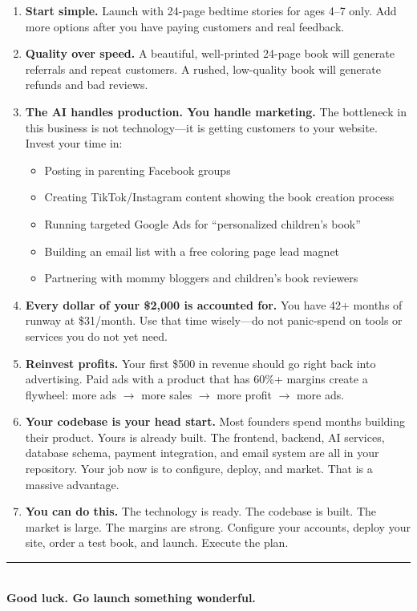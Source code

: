 \documentclass[12pt, letterpaper, oneside]{book}
\begin{document}
\begin{enumerate}[leftmargin=2em, itemsep=8pt]
  \item \textbf{Start simple.} Launch with 24-page bedtime stories for ages 4--7 only. Add more options after you have paying customers and real feedback.

  \item \textbf{Quality over speed.} A beautiful, well-printed 24-page book will generate referrals and repeat customers. A rushed, low-quality book will generate refunds and bad reviews.

  \item \textbf{The AI handles production. You handle marketing.} The bottleneck in this business is not technology---it is getting customers to your website. Invest your time in:
  \begin{itemize}[leftmargin=1.5em]
    \item Posting in parenting Facebook groups
    \item Creating TikTok/Instagram content showing the book creation process
    \item Running targeted Google Ads for ``personalized children's book''
    \item Building an email list with a free coloring page lead magnet
    \item Partnering with mommy bloggers and children's book reviewers
  \end{itemize}

  \item \textbf{Every dollar of your \$2{,}000 is accounted for.} You have 42+ months of runway at \$31/month. Use that time wisely---do not panic-spend on tools or services you do not yet need.

  \item \textbf{Reinvest profits.} Your first \$500 in revenue should go right back into advertising. Paid ads with a product that has 60\%+ margins create a flywheel: more ads $\rightarrow$ more sales $\rightarrow$ more profit $\rightarrow$ more ads.

  \item \textbf{Your codebase is your head start.} Most founders spend months building their product. Yours is already built. The frontend, backend, AI services, database schema, payment integration, and email system are all in your repository. Your job now is to configure, deploy, and market. That is a massive advantage.

  \item \textbf{You can do this.} The technology is ready. The codebase is built. The market is large. The margins are strong. Configure your accounts, deploy your site, order a test book, and launch. Execute the plan.
\end{enumerate}

\vfill
\begin{center}
\rule{2in}{0.4pt}\\[12pt]
{\large\textcolor{primary}{\textbf{Good luck. Go launch something wonderful.}}}
\end{center}
\end{document}
